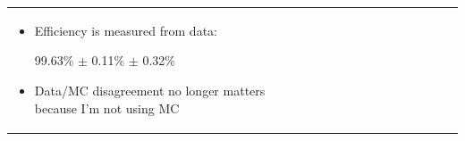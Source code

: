 \documentclass[landscape]{article}
\begin{document}
\begin{tabular}{p{0.6\linewidth} p{0.4\linewidth}}
\begin{minipage}{1.1\linewidth}
    \begin{itemize}

      \item Efficiency is measured from data:
\begin{center} 99.63\% $\pm$ 0.11\% $\pm$ 0.32\% \end{center}

\vspace{1 cm}
      \item Data/MC disagreement no longer matters because I'm
      not using MC

    \end{itemize}

  \end{minipage} \\
\end{tabular}
\end{document}
